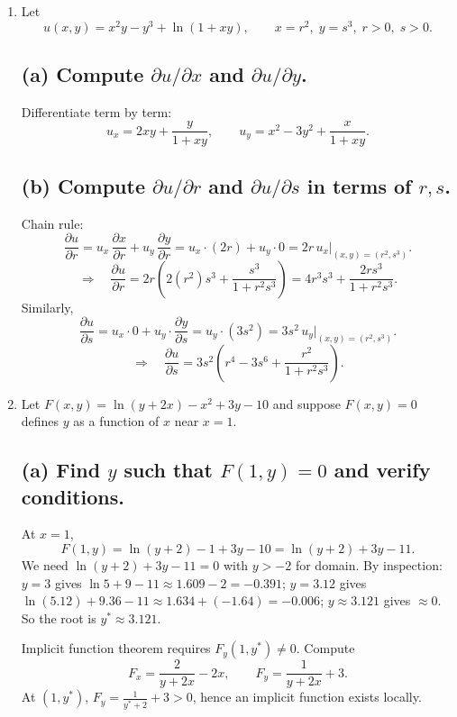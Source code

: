 \documentclass[12pt]{article}
\begin{document}
\begin{enumerate}
\newpage

\item

Let
\[
u(x,y)=x^2y - y^3 + \ln(1+xy),\qquad x=r^2,\; y=s^3,\; r>0,\; s>0.
\]

\subsection*{(a) Compute $\partial u/\partial x$ and $\partial u/\partial y$.}
Differentiate term by term:
\[
u_x = 2xy + \frac{y}{1+xy}, \qquad
u_y = x^2 - 3y^2 + \frac{x}{1+xy}.
\]

\subsection*{(b) Compute $\partial u/\partial r$ and $\partial u/\partial s$ in terms of $r,s$.}
Chain rule:
\[
\frac{\partial u}{\partial r} = u_x\,\frac{\partial x}{\partial r} + u_y\,\frac{\partial y}{\partial r}
= u_x\cdot (2r) + u_y\cdot 0
= 2r\,u_x\Big|_{(x,y)=(r^2,s^3)}.
\]
\[
\Rightarrow\quad \frac{\partial u}{\partial r}
=2r\left(2(r^2)s^3+\frac{s^3}{1+r^2s^3}\right)
= 4r^3 s^3 + \frac{2r s^3}{1+r^2 s^3}.
\]
Similarly,
\[
\frac{\partial u}{\partial s} = u_x\cdot 0 + u_y\cdot \frac{\partial y}{\partial s}
= u_y\cdot (3s^2)
= 3s^2\,u_y\Big|_{(x,y)=(r^2,s^3)}.
\]
\[
\Rightarrow\quad \frac{\partial u}{\partial s}
= 3s^2\left(r^4 - 3s^6 + \frac{r^2}{1+r^2 s^3}\right).
\]


\vspace{1cm}
\item

Let $F(x,y)=\ln(y+2x)-x^2+3y-10$ and suppose $F(x,y)=0$ defines $y$ as a function of $x$ near $x=1$.

\subsection*{(a) Find $y$ such that $F(1,y)=0$ and verify conditions.}
At $x=1$,
\[
F(1,y)=\ln(y+2)-1+3y-10=\ln(y+2)+3y-11.
\]
We need $\ln(y+2)+3y-11=0$ with $y>-2$ for domain.
By inspection: $y=3$ gives $\ln 5 +9-11\approx 1.609-2=-0.391$; $y=3.12$ gives $\ln(5.12)+9.36-11\approx 1.634+(-1.64)=-0.006$; $y\approx 3.121$ gives $\approx 0$.
So the root is $y^\ast\approx 3.121$.

Implicit function theorem requires $F_y(1,y^\ast)\neq 0$. Compute
\[
F_x = \frac{2}{y+2x}-2x,\qquad
F_y = \frac{1}{y+2x}+3.
\]
At $(1,y^\ast)$, $F_y= \frac{1}{y^\ast+2}+3>0$, hence an implicit function exists locally.


\end{enumerate}
\end{document}
